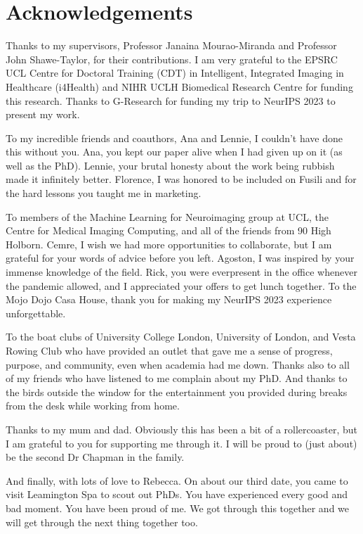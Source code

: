 \chapter*{Acknowledgements}

\noindent Thanks to my supervisors, Professor Janaina Mourao-Miranda and Professor John Shawe-Taylor, for their contributions. I am very grateful to the EPSRC UCL Centre for Doctoral Training (CDT) in Intelligent, Integrated Imaging in Healthcare (i4Health) and NIHR UCLH Biomedical Research Centre for funding this research. Thanks to G-Research for funding my trip to NeurIPS 2023 to present my work.

\bigskip

\noindent To my incredible friends and coauthors, Ana and Lennie, I couldn't have done this without you. Ana, you kept our paper alive when I had given up on it (as well as the PhD). Lennie, your brutal honesty about the work being rubbish made it infinitely better. Florence, I was honored to be included on Fusili and for the hard lessons you taught me in marketing.

\bigskip

\noindent To members of the Machine Learning for Neuroimaging group at UCL, the Centre for Medical Imaging Computing, and all of the friends from 90 High Holborn. Cemre, I wish we had more opportunities to collaborate, but I am grateful for your words of advice before you left. Agoston, I was inspired by your immense knowledge of the field. Rick, you were everpresent in the office whenever the pandemic allowed, and I appreciated your offers to get lunch together. To the Mojo Dojo Casa House, thank you for making my NeurIPS 2023 experience unforgettable.

\bigskip

\noindent To the boat clubs of University College London, University of London, and Vesta Rowing Club who have provided an outlet that gave me a sense of progress, purpose, and community, even when academia had me down. Thanks also to all of my friends who have listened to me complain about my PhD. And thanks to the birds outside the window for the entertainment you provided during breaks from the desk while working from home.

\bigskip

\noindent Thanks to my mum and dad. Obviously this has been a bit of a rollercoaster, but I am grateful to you for supporting me through it. I will be proud to (just about) be the second Dr Chapman in the family.

\bigskip

\noindent And finally, with lots of love to Rebecca. On about our third date, you came to visit Leamington Spa to scout out PhDs. You have experienced every good and bad moment. You have been proud of me. We got through this together and we will get through the next thing together too.